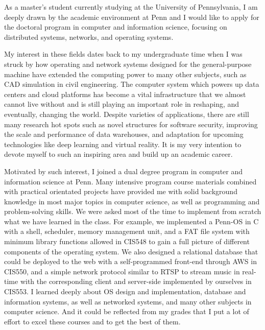 \documentclass[12pt]{article}
\begin{document}
As a master's student currently studying at the University of Pennsylvania, I am
deeply drawn by the academic environment at Penn and I would like to apply for
the doctoral program in computer and information science, focusing on
distributed systems, networks, and operating systems.

My interest in these fields dates back to my undergraduate time when I was
struck by how operating and network systems designed for the general-purpose
machine have extended the computing power to many other subjects, such as CAD
simulation in civil engineering. The computer system which powers up data
centers and cloud platforms has become a vital infrastructure that we almost
cannot live without and is still playing an important role in reshaping, and
eventually, changing the world. Despite varieties of applications, there are
still many research hot spots such as novel structures for software security,
improving the scale and performance of data warehouses, and adaptation for
upcoming technologies like deep learning and virtual reality. It is my very
intention to devote myself to such an inspiring area and build up an academic
career.

Motivated by such interest, I joined a dual degree program in computer and
information science at Penn. Many intensive program course materials combined
with practical orientated projects have provided me with solid background
knowledge in most major topics in computer science, as well as programming and
problem-solving skills. We were asked most of the time to implement from scratch
what we have learned in the class. For example, we implemented a Penn-OS in C
with a shell, scheduler, memory management unit, and a FAT file system with
minimum library functions allowed in CIS548 to gain a full picture of different
components of the operating system. We also designed a relational database that
could be deployed to the web with a self-programmed front-end through AWS in
CIS550, and a simple network protocol similar to RTSP to stream music in
real-time with the corresponding client and server-side implemented by ourselves
in CIS553. I learned deeply about OS design and implementation, database and
information systems, as well as networked systems, and many other subjects in
computer science. And it could be reflected from my grades that I put a lot of
effort to excel these courses and to get the best of them.
\end{document}
